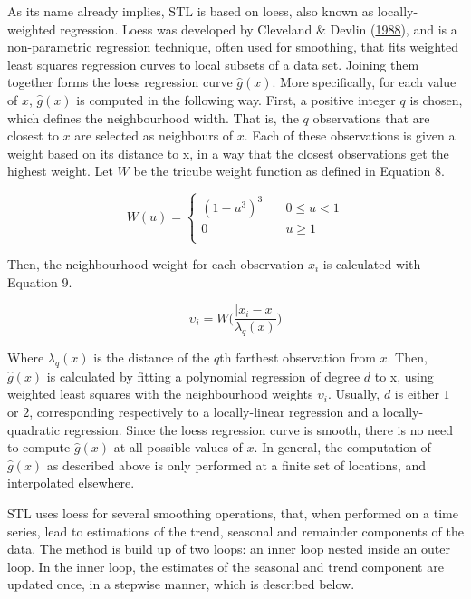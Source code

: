 \documentclass[12pt,oneside]{reedthesis}
\begin{document}
As its name already implies, STL is based on loess, also known as
locally-weighted regression. Loess was developed by Cleveland \& Devlin
(\protect\hyperlink{ref-cleveland1988}{1988}), and is a non-parametric
regression technique, often used for smoothing, that fits weighted least
squares regression curves to local subsets of a data set. Joining them
together forms the loess regression curve \(\hat{g}(x)\). More
specifically, for each value of \(x\), \(\hat{g}(x)\) is computed in the
following way. First, a positive integer \(q\) is chosen, which defines
the neighbourhood width. That is, the \(q\) observations that are
closest to \(x\) are selected as neighbours of \(x\). Each of these
observations is given a weight based on its distance to x, in a way that
the closest observations get the highest weight. Let \(W\) be the
tricube weight function as defined in Equation 8.

\[
W(u) = 
    \begin{cases}
      (1 - u^{3})^{3} &\quad 0 \leq u < 1\\
      0 &\quad u \geq 1\\
    \end{cases}
\]

Then, the neighbourhood weight for each observation \(x_{i}\) is
calculated with Equation 9.

\[ \upsilon_{i} = W\Bigg(\frac{|x_{i} - x|}{\lambda_{q}(x)}\Bigg) \]

Where \(\lambda_{q}(x)\) is the distance of the \(q\)th farthest
observation from \(x\). Then, \(\hat{g}(x)\) is calculated by fitting a
polynomial regression of degree \(d\) to x, using weighted least squares
with the neighbourhood weights \(\upsilon_{i}\). Usually, \(d\) is
either \(1\) or \(2\), corresponding respectively to a locally-linear
regression and a locally-quadratic regression. Since the loess
regression curve is smooth, there is no need to compute \(\hat{g}(x)\)
at all possible values of \(x\). In general, the computation of
\(\hat{g}(x)\) as described above is only performed at a finite set of
locations, and interpolated elsewhere.

STL uses loess for several smoothing operations, that, when performed on
a time series, lead to estimations of the trend, seasonal and remainder
components of the data. The method is build up of two loops: an inner
loop nested inside an outer loop. In the inner loop, the estimates of
the seasonal and trend component are updated once, in a stepwise manner,
which is described below.
\end{document}
